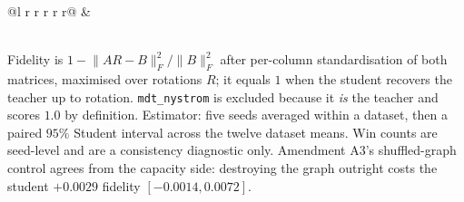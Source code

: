 \begin{table}[t]
\begin{tabular}{@{}l r r r r r@{}}
\midrule
{}
             & \\
\bottomrule
\end{tabular}\\[2pt]
{\footnotesize Fidelity is $1 - \lVert AR - B\rVert_F^2 / \lVert B\rVert_F^2$ after per-column
standardisation of both matrices, maximised over rotations $R$; it equals $1$ when the student recovers
the teacher up to rotation. \texttt{mdt\_nystrom} is excluded because it \emph{is} the teacher and
scores $1.0$ by definition. Estimator: five seeds averaged within a dataset, then a paired $95\%$
Student interval across the twelve dataset means. Win counts are seed-level and are a consistency
diagnostic only. Amendment A3's shuffled-graph control agrees from the capacity side: destroying the
graph outright costs the student $+0.0029$ fidelity $[-0.0014, 0.0072]$.}
\end{table}
